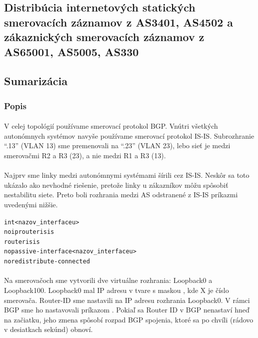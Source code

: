 \documentclass[12pt,twoside,a4paper]{report}
\begin{document}
\subsection{Distribúcia internetových statických smerovacích záznamov z AS3401, AS4502 a zákaznických smerovacích záznamov z AS65001, AS5005, AS330}
\subsection{Sumarizácia}


\subsubsection{Popis}
\paragraph{}
V celej topológií používame smerovací protokol BGP. Vnútri všetkých autonómnych systémov navyše používame smerovací protokol IS-IS. Subrozhranie “.13” (VLAN 13) sme premenovali na “.23” (VLAN 23), lebo sieť je medzi smerovačmi R2 a R3 (23), a nie medzi R1 a R3 (13).

\paragraph{}
Najprv sme linky medzi autonómnymi systémami šírili cez IS-IS. Neskôr sa toto ukázalo ako nevhodné riešenie, pretože  linky u zákazníkov môžu spôsobiť nestabilitu siete. Preto boli rozhrania medzi AS odstranené z IS-IS príkazmi uvedenými nižšie.

\noindent
{\selectfont
\begin{small}
\begin{alltt}
int <nazov_interfaceu>
  no ip router isis
router isis
  no passive-interface <nazov_interfaceu>
  no redistribute-connected
\end{alltt}
\end{small}
}

\paragraph{}
Na smerovačoch sme vytvorili dve virtuálne rozhrania: Loopback0 a Loopback100. Loopback0 mal IP adresu v tvare  s maskou , kde X je číslo smerovača. Router-ID sme nastavili na IP adresu rozhrania Loopback0. V rámci BGP sme ho nastavovali príkazom . Pokiaľ sa Router ID v BGP nenastaví hneď na začiatku, jeho zmena spôsobí rozpad BGP spojenia, ktoré sa po chvíli (rádovo v desiatkach sekúnd) obnoví.
\end{document}
